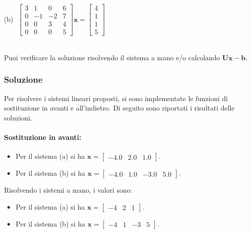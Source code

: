 \documentclass[letterpaper, 12pt]{article}
\numberwithin{equation}{section}    %
\begin{document}
\hfill
\begin{minipage}{0.48\textwidth}
    (b) $\;\begin{bmatrix}
        3 & 1 & 0 & 6 \\
        0 & -1 & -2 & 7 \\
        0 & 0 & 3 & 4 \\
        0 & 0 & 0 & 5
        \end{bmatrix} \mathbf{x} = \begin{bmatrix}
        4 \\ 1 \\ 1 \\ 5
        \end{bmatrix}$
\end{minipage}
\\
Puoi verificare la soluzione risolvendo il sistema a mano e/o calcolando $\mathbf{U}\mathbf{x} - \mathbf{b}$.
\subsubsection{Soluzione}
Per risolvere i sistemi lineari proposti, si sono implementate le funzioni di sostituzione in avanti e all'indietro. 
Di seguito sono riportati i risultati delle soluzioni.
\paragraph{Sostituzione in avanti:}
\begin{itemize}
    \item Per il sistema (a) si ha $\mathbf{x} = \begin{bmatrix} -4.0 & 2.0 & 1.0 \end{bmatrix}$.
    \item Per il sistema (b) si ha $\mathbf{x} = \begin{bmatrix} -4.0 & 1.0 & -3.0 & 5.0 \end{bmatrix}$.
\end{itemize}
Risolvendo i sistemi a mano, i valori sono:
\begin{itemize}
    \item Per il sistema (a) si ha $\mathbf{x} = \begin{bmatrix} -4 & 2 & 1 \end{bmatrix}$.
    \item Per il sistema (b) si ha $\mathbf{x} = \begin{bmatrix} -4 & 1 & -3 & 5 \end{bmatrix}$.
\end{itemize}
\end{document}
